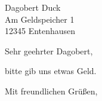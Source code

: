 \documentclass[12pt,ngerman]{scrlttr2}
\begin{document}
\begin{letter}{Dagobert Duck \\ Am Geldspeicher 1 \\ 12345 Entenhausen}
\opening{Sehr geehrter Dagobert,}

bitte gib uns etwas Geld.

\closing{Mit freundlichen Grüßen,}
\end{letter}
\end{document}
